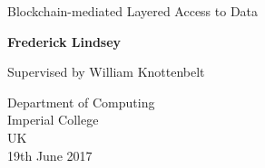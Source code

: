\documentclass[twoside, a4paper, titlepage]{report}
\begin{document}
\begin{titlepage}
    \begin{center}
        \vspace*{1cm}

        \vspace{0.5cm}
				\Large{Blockchain-mediated Layered Access to Data}

        \vspace{1.5cm}

        \large{
	        \textbf{
	        	Frederick Lindsey
					}
				}

        \vfill

        \large{Supervised by William Knottenbelt}

        \vspace{0.8cm}

        Department of Computing\\
				Imperial College\\
        UK\\
        19th June 2017

    \end{center}
\end{titlepage}


\tableofcontents
\newpage




\end{document}
